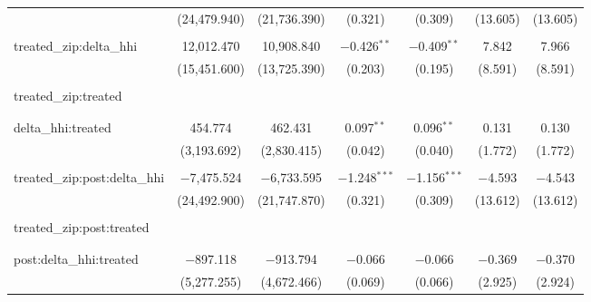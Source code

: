 \begin{table}[H]
{\begin{tabular}{@{\extracolsep{5pt}}lcccccc}
   & (24,479.940) & (21,736.390) & (0.321) & (0.309) & (13.605) & (13.605) \\  

   & & & & & & \\  

  treated\_zip:delta\_hhi & 12,012.470 & 10,908.840 & $-$0.426$^{**}$ & $-$0.409$^{**}$ & 7.842 & 7.966 \\  

   & (15,451.600) & (13,725.390) & (0.203) & (0.195) & (8.591) & (8.591) \\  

   & & & & & & \\  

  treated\_zip:treated &  &  &  &  &  &  \\  

   &  &  &  &  &  &  \\  

   & & & & & & \\  

  delta\_hhi:treated & 454.774 & 462.431 & 0.097$^{**}$ & 0.096$^{**}$ & 0.131 & 0.130 \\  

   & (3,193.692) & (2,830.415) & (0.042) & (0.040) & (1.772) & (1.772) \\  

   & & & & & & \\  

  treated\_zip:post:delta\_hhi & $-$7,475.524 & $-$6,733.595 & $-$1.248$^{***}$ & $-$1.156$^{***}$ & $-$4.593 & $-$4.543 \\  

   & (24,492.900) & (21,747.870) & (0.321) & (0.309) & (13.612) & (13.612) \\  

   & & & & & & \\  

  treated\_zip:post:treated &  &  &  &  &  &  \\  

   &  &  &  &  &  &  \\  

   & & & & & & \\  

  post:delta\_hhi:treated & $-$897.118 & $-$913.794 & $-$0.066 & $-$0.066 & $-$0.369 & $-$0.370 \\  

   & (5,277.255) & (4,672.466) & (0.069) & (0.066) & (2.925) & (2.924) \\  


\end{tabular}}
\end{table}
